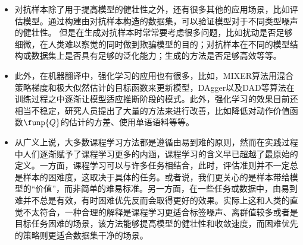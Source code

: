 \begin{itemize}
\vspace{0.5em}
\item 对抗样本除了用于提高模型的健壮性之外，还有很多其他的应用场景，比如评估模型。通过构建由对抗样本构造的数据集，可以验证模型对于不同类型噪声的健壮性。 但是在生成对抗样本时常常要考虑很多问题，比如扰动是否足够细微，在人类难以察觉的同时做到欺骗模型的目的；对抗样本在不同的模型结构或数据集上是否具有足够的泛化能力；生成的方法是否足够高效等等。

\vspace{0.5em}
\item 此外，在机器翻译中，强化学习的应用也有很多，比如，MIXER算法用混合策略梯度和极大似然估计的目标函数来更新模型，DAgger以及DAD等算法在训练过程之中逐渐让模型适应推断阶段的模式。此外，强化学习的效果目前还相当不稳定，研究人员提出了大量的方法来进行改善，比如降低对动作价值函数$\funp{Q}$的估计的方差、使用单语语料等等。

\vspace{0.5em}
\item 从广义上说，大多数课程学习方法都是遵循由易到难的原则，然而在实践过程中人们逐渐赋予了课程学习更多的内涵，课程学习的含义早已超越了最原始的定义。一方面，课程学习可以与许多任务相结合，此时，评估准则并不一定总是样本的困难度，这取决于具体的任务。或者说，我们更关心的是样本带给模型的“价值”，而非简单的难易标准。另一方面，在一些任务或数据中，由易到难并不总是有效，有时困难优先反而会取得更好的效果。实际上这和人类的直觉不太符合，一种合理的解释是课程学习更适合标签噪声、离群值较多或者是目标任务困难的场景，该方法能够提高模型的健壮性和收敛速度，而困难优先的策略则更适合数据集干净的场景。

\vspace{0.5em}
\end{itemize}
